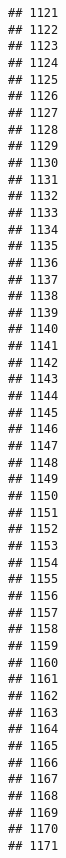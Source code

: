 \documentclass[
]{article}
\begin{document}
\begin{verbatim}
## 1121                                           
## 1122                                           
## 1123                                           
## 1124                                           
## 1125                                           
## 1126                                           
## 1127                                           
## 1128                                           
## 1129                                           
## 1130                                           
## 1131                                           
## 1132                                           
## 1133                                           
## 1134                                           
## 1135                                           
## 1136                                           
## 1137                                           
## 1138                                           
## 1139                                           
## 1140                                           
## 1141                                           
## 1142                                           
## 1143                                           
## 1144                                           
## 1145                                           
## 1146                                           
## 1147                                           
## 1148                                           
## 1149                                           
## 1150                                           
## 1151                                           
## 1152                                           
## 1153                                           
## 1154                                           
## 1155                                           
## 1156                                           
## 1157                                           
## 1158                                           
## 1159                                           
## 1160                                           
## 1161                                           
## 1162                                           
## 1163                                           
## 1164                                           
## 1165                                           
## 1166                                           
## 1167                                           
## 1168                                           
## 1169                                           
## 1170                                           
## 1171                                           

\end{verbatim}
\end{document}
